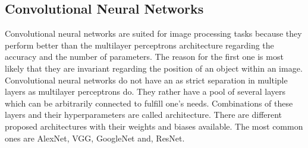 \subsection{Convolutional Neural Networks}
\label{sec:neural-networks-convolutional-neural-networks}
Convolutional neural networks are suited for image processing tasks because they perform better than the multilayer perceptrons architecture regarding the accuracy and the number of parameters\cite{Lecun98}\cite{LeCun1998cnn}.
The reason for the first one is most likely that they are invariant regarding the position of an object within an image.
Convolutional neural networks do not have an as strict separation in multiple layers as multilayer perceptrons do.
They rather have a pool of several layers which can be arbitrarily connected to fulfill one's needs.
Combinations of these layers and their hyperparameters are called architecture.
There are different proposed architectures with their weights and biases available.
The most common ones are AlexNet, VGG, GoogleNet and, ResNet.



